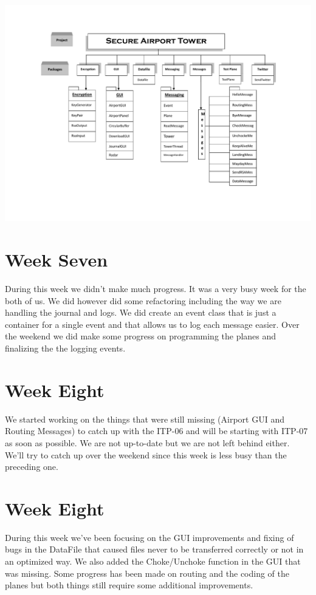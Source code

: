 \documentclass{article}
\begin{document}
\includegraphics[scale=0.45]{UML.pdf}
\newpage

\section{Week Seven}
During this week we didn't make much progress. It was a very busy week for the both of us. We did however did some refactoring including the way we are handling the journal and logs. We did create an event class that is just a container for a single event and that allows us to log each message easier. Over the weekend we did make some progress on programming the planes and finalizing the the logging events.
\section{Week Eight}
We started working on the things that were still missing (Airport GUI and Routing Messages) to catch up with the ITP-06 and will be starting with ITP-07 as soon as possible. We are not up-to-date but we are not left behind either. We'll try to catch up over the weekend since this week is less busy than the preceding one.

\section{Week Eight}
During this week we've been focusing on the GUI improvements and fixing of bugs in the DataFile that caused files never to be transferred correctly or not in an optimized way. We also added the Choke/Unchoke function in the GUI that was missing. Some progress has been made on routing and the coding of the planes but both things still require some additional improvements.
\end{document}
